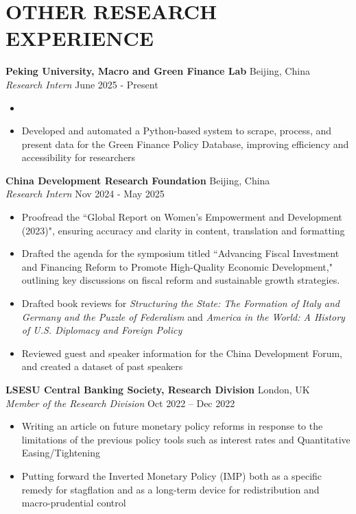 \documentclass[a4paper,9pt]{extarticle}
\begin{document}
\section*{OTHER RESEARCH EXPERIENCE}
\noindent
\textbf{Peking University, Macro and Green Finance Lab} \hfill Beijing, China \\
\textit{Research Intern} \hfill June 2025 - Present
\begin{itemize}
    \item \item Developed and automated a Python-based system to scrape, process, and present data for the Green Finance Policy Database, improving efficiency and accessibility for researchers
\end{itemize}
\noindent
\textbf{China Development Research Foundation} \hfill Beijing, China \\
\textit{Research Intern} \hfill Nov 2024 - May 2025
\begin{itemize}
    \item Proofread the ``Global Report on Women's Empowerment and Development (2023)", ensuring accuracy and clarity in content, translation and formatting
    \item Drafted the agenda for the symposium titled ``Advancing Fiscal Investment and Financing Reform to Promote High-Quality Economic Development," outlining key discussions on fiscal reform and sustainable growth strategies.
    \item Drafted book reviews for \textit{Structuring the State: The Formation of Italy and Germany and the Puzzle of Federalism} and \textit{America in the World: A History of U.S. Diplomacy and Foreign Policy}
    \item Reviewed guest and speaker information for the China Development Forum, and created a dataset of past speakers
\end{itemize}
\noindent
\textbf{LSESU Central Banking Society, Research Division} \hfill London, UK\\ %
\textit{Member of the Research Division} \hfill Oct 2022 – Dec 2022 %
\begin{itemize}
    \item Writing an article on future monetary policy reforms in response to the limitations of the previous policy tools such as interest rates and Quantitative Easing/Tightening
    \item Putting forward the Inverted Monetary Policy (IMP) both as a specific remedy for stagflation and as a long-term device  for redistribution and macro-prudential control
\end{itemize}
\end{document}
